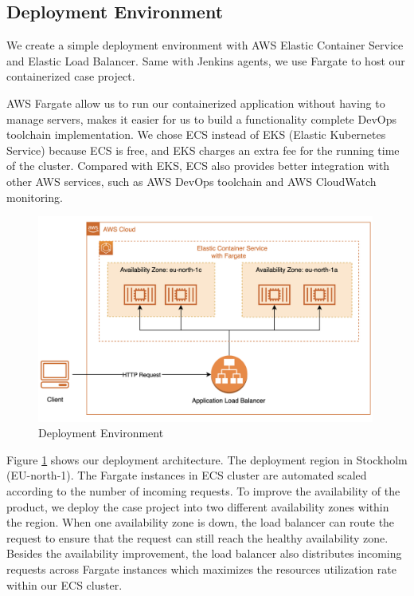 \subsection{Deployment Environment}
We create a simple deployment environment with AWS Elastic Container Service and Elastic Load Balancer. Same with Jenkins agents, we use Fargate to host our containerized case project. 
\par
AWS Fargate allow us to run our containerized application without having to manage servers, makes it easier for us to build a functionality complete DevOps toolchain implementation. We chose ECS instead of EKS (Elastic Kubernetes Service) because ECS is free, and EKS charges an extra fee for the running time of the cluster. Compared with EKS, ECS also provides better integration with other AWS services, such as AWS DevOps toolchain and AWS CloudWatch monitoring.
\begin{figure}[h]
     \centering
     \includegraphics[width=0.99\textwidth]{pics/deploy.png}
     \caption{Deployment Environment}
     \label{fig:deploy}
\end{figure}
\par
Figure \ref{fig:deploy} shows our deployment architecture. The deployment region in Stockholm (EU-north-1). The Fargate instances in ECS cluster are automated scaled according to the number of incoming requests.
To improve the availability of the product, we deploy the case project into two different availability zones within the region.
When one availability zone is down, the load balancer can route the request to ensure that the request can still reach the healthy availability zone. Besides the availability improvement, the load balancer also distributes incoming requests across Fargate instances which maximizes the resources utilization rate within our ECS cluster.
